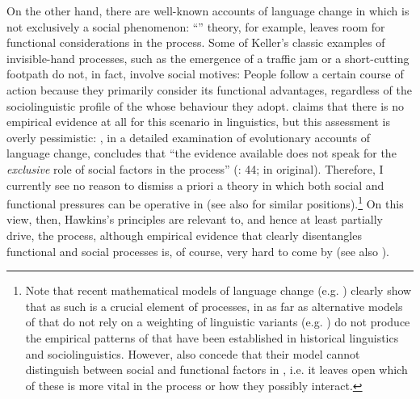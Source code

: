 \documentclass[output=paper]{langsci/langscibook}
\begin{document}
On the other hand, there are well-known accounts of language change in which  is not exclusively a social phenomenon:  “” theory, for example, leaves room for functional considerations in the  process. Some of Keller’s classic examples of invisible-hand processes, such as the emergence of a traffic jam or a short-cutting footpath do not, in fact, involve social motives: People follow a certain course of action because they primarily consider its functional advantages, regardless of the sociolinguistic profile of the  whose behaviour they adopt. \citet{Cristofaro2017_Dep} claims that there is no empirical evidence at all for this scenario in linguistics, but this assessment is overly pessimistic: \citet{Rosenbach2008_Change}, in a detailed examination of evolutionary accounts of language change, concludes that “the evidence available does not speak for the \textit{exclusive} role of social factors in the  process” (\citealt{Rosenbach2008_Change}: 44;  in original). Therefore, I currently see no reason to dismiss a priori a theory in which both social and functional  pressures can be operative in  (see also \citealt{Haspelmath1999_Opt,Nettle1999_Div,Enfield2014_Caus} for similar positions).\footnote{Note that recent mathematical models of language change (e.g. \citealt{BlytheCroft2012}) clearly show that  as such is a crucial element of  processes, in as far as alternative models of  that do not rely on a weighting of linguistic variants (e.g. \citealt{Trudgill2004_Dial}) do not produce the empirical patterns of  that have been established in historical linguistics and sociolinguistics. However, \citet{BlytheCroft2012} also concede that their model cannot distinguish between social and functional factors in , i.e. it leaves open which of these is more vital in the  process or how they possibly interact.} On this view, then, Hawkins’s  principles are relevant to, and hence at least partially drive, the  process, although empirical evidence that clearly disentangles functional and social  processes is, of course, very hard to come by (see also \citealt{Seiler2006_Func}). 
\end{document}
